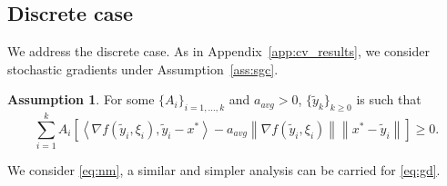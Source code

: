 \documentclass{article}
\def\N{{\mathbb{N}}}
\def\xdisctilde{\{\tilde{x}_k \}_{k\in \N}}
\def\pl{{\text{PL}^\mu}}
\newcommand{\bpar}[1]{\left(#1\right)}
\newcommand{\norm}[1]{\left\lVert#1\right\rVert}
\newcommand{\dotprod}[1]{\left< #1\right>}
\newcommand{\ls}{\text{LS}^{L}}
\newcommand{\qgf}[1]{\text{QG}_{+}^{#1}}
\newcommand{\qginff}[1]{\text{QG}_{-}^{#1}}
\theoremstyle{plain}
\newtheorem{theorem}{Theorem}[section]
\theoremstyle{definition}
\newtheorem{assumption}[theorem]{Assumption}
\theoremstyle{remark}
\begin{document}
\subsection{Discrete case}\label{app:pl_accel_avg}
We address the discrete case. As in Appendix~\ref{app:cv_results}, we consider stochastic gradients under Assumption~\ref{ass:sgc}.  
\begin{assumption}\label{ass:avg}
  For some $\{ A_i \}_{i =1,\dots,k}$ and $a_{avg} > 0$, $\{\tilde y_k \}_{k\ge 0}$ is such that
    $$\sum_{i = 1}^k A_i  \left[\dotprod{\nabla
     f(\tilde y_i,\xi_i),\tilde y_i-x^\ast}-a_{avg} \norm{\nabla
     f(\tilde y_i,\xi_i)}\norm{x^\ast - \tilde y_i}\right] \ge 0.$$
\end{assumption}
We consider \eqref{eq:nm}, a similar and simpler analysis can be carried for \eqref{eq:gd}.
\end{document}
